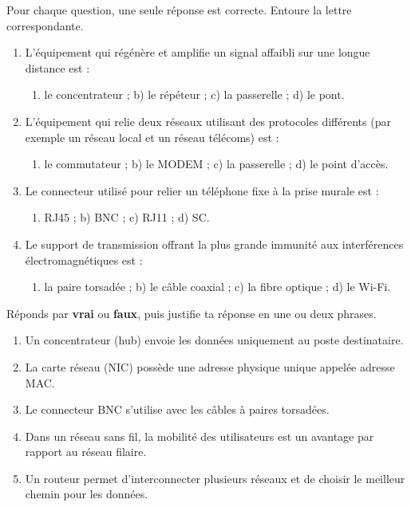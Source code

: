 \documentclass[11pt]{article}
\begin{document}
\begin{exercice}
Pour chaque question, une seule réponse est correcte. Entoure la lettre correspondante.
\begin{enumerate}
  \item L'équipement qui régénère et amplifie un signal affaibli sur une longue distance est :
  \begin{enumerate}
    \item[a)] le concentrateur ; \quad b) le répéteur ; \quad c) la passerelle ; \quad d) le pont.
  \end{enumerate}
  \item L'équipement qui relie deux réseaux utilisant des protocoles différents (par exemple un réseau local et un réseau télécoms) est :
  \begin{enumerate}
    \item[a)] le commutateur ; \quad b) le MODEM ; \quad c) la passerelle ; \quad d) le point d'accès.
  \end{enumerate}
  \item Le connecteur utilisé pour relier un téléphone fixe à la prise murale est :
  \begin{enumerate}
    \item[a)] RJ45 ; \quad b) BNC ; \quad c) RJ11 ; \quad d) SC.
  \end{enumerate}
  \item Le support de transmission offrant la plus grande immunité aux interférences électromagnétiques est :
  \begin{enumerate}
    \item[a)] la paire torsadée ; \quad b) le câble coaxial ; \quad c) la fibre optique ; \quad d) le Wi-Fi.
  \end{enumerate}
\end{enumerate}
\end{exercice}

\begin{exercice}
Réponds par \textbf{vrai} ou \textbf{faux}, puis justifie ta réponse en une ou deux phrases.
\begin{enumerate}
  \item Un concentrateur (hub) envoie les données uniquement au poste destinataire.
  \item La carte réseau (NIC) possède une adresse physique unique appelée adresse MAC.
  \item Le connecteur BNC s'utilise avec les câbles à paires torsadées.
  \item Dans un réseau sans fil, la mobilité des utilisateurs est un avantage par rapport au réseau filaire.
  \item Un routeur permet d'interconnecter plusieurs réseaux et de choisir le meilleur chemin pour les données.
\end{enumerate}
\end{exercice}
\end{document}
